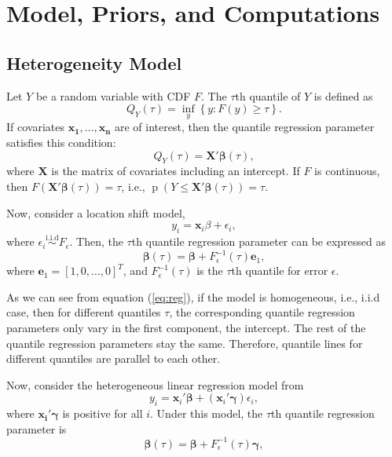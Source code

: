 \documentclass[12pt]{article}
\DeclareMathOperator{\pr}{p}
\begin{document}
\section{Model, Priors, and Computations}
\label{sec:model}
\subsection{Heterogeneity Model}
Let $Y$ be a random variable with CDF $F$.  The $\tau$th quantile of
$Y$ is defined as
\begin{displaymath}
  Q_Y(\tau) = \underset{y}{\inf} \left\{ y: F(y) \ge \tau \right\}.
\end{displaymath}
If covariates $\bm{x_1, \ldots, x_n}$ are of interest, then the
quantile regression parameter satisfies this condition:
\begin{displaymath}
  Q_Y(\tau) = \bm{X'\beta}(\tau),
\end{displaymath}
where $\bm{X}$ is the matrix of covariates including an intercept.  If
$F$ is continuous, then $F(\bm{X'\beta}(\tau)) = \tau$, i.e., $\pr(Y
\le \bm{X'\beta}(\tau)) = \tau$.

Now, consider a location shift model,
\begin{displaymath}
  y_i = \bm{x}_i\beta + \epsilon_i,
\end{displaymath}
where $\epsilon_i \stackrel{\text{i.i.d}}{\sim} F_{\epsilon}$. Then,
the $\tau$th quantile regression parameter can be expressed as
\begin{equation} \label{eq:reg} \bm{\beta}(\tau) = \bm{\beta} +
  F^{-1}_{\epsilon}(\tau) \bm{e}_1,
\end{equation}
where $\bm{e}_1 = [1, 0, \ldots, 0]^T$, and $F^{-1}_{\epsilon}(\tau)$
is the $\tau$th quantile for error $\epsilon$.

As we can see from equation (\ref{eq:reg}), if the model is
homogeneous, i.e., i.i.d case, then for different quantiles $\tau$,
the corresponding quantile regression parameters only vary in the
first component, the intercept. The rest of the quantile regression
parameters stay the same. Therefore, quantile lines for different
quantiles are parallel to each other.

Now, consider the heterogeneous linear regression model from
\citet{he1998}
\begin{equation}\label{eq:he}
  y_i = \bm{x}_i'\bm{\beta} + (\bm{x}_i'\bm{\gamma}) \epsilon_i,
\end{equation}
where $\bm{x_i'\gamma}$ is positive for all $i$. Under this model, the
$\tau$th quantile regression parameter is
\begin{equation}\label{eq:quan}
  \bm{\beta}(\tau) = \bm{\beta} + F^{-1}_{\epsilon}(\tau) \bm{\gamma},
\end{equation}
\end{document}
